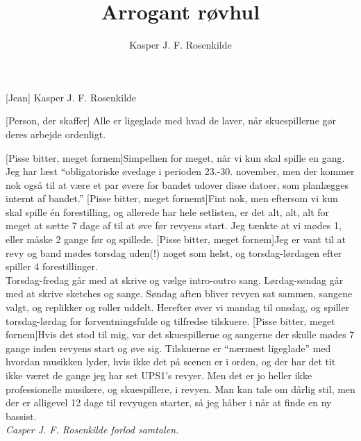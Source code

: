 \documentclass[a4paper,11pt]{article}
\title{Arrogant røvhul}
\author{Kasper J. F. Rosenkilde}
\begin{document}
\maketitle

\begin{roles}
    [Jean] Kasper J. F. Rosenkilde
\end{roles}

\begin{props}
    [Person, der skaffer] Alle er ligeglade med hvad de laver, når skuespillerne gør deres arbejde ordenligt.
\end{props}


\begin{sketch}


[Pisse bitter, meget fornem]Simpelhen for meget, når vi kun skal spille en gang. Jeg har læst ``obligatoriske øvedage i perioden 23.-30. november, men der kommer nok også til at være et par øvere for bandet udover disse datoer, som planlægges internt af bandet.''
[Pisse bitter, meget fornemt]Fint nok, men eftersom vi kun skal spille én forestilling, og allerede har hele setlisten, er det alt, alt, alt for meget at sætte 7 dage af til at øve før revyens start. Jeg tænkte at vi mødes 1, eller måske 2 gange før og spillede. 
[Pisse bitter, meget fornem]Jeg er vant til at revy og band mødes torsdag uden(!) noget som helst, og torsdag-lørdagen efter spiller 4 forestillinger.\\
Torsdag-fredag går med at skrive og vælge intro-outro sang. Lørdag-søndag går med at skrive sketches og sange. Søndag aften bliver revyen sat sammen, sangene valgt, og replikker og roller uddelt. Herefter øver vi mandag til onsdag, og spiller torsdag-lørdag for forventningsfulde og tilfredse tilskuere.
[Pisse bitter, meget fornem]Hvis det stod til mig, var det skuespillerne og sangerne der skulle mødes 7 gange inden revyens start og øve sig. Tilskuerne er ``nærmest ligeglade'' med hvordan musikken lyder, hvis ikke det på scenen er i orden, og der har det tit ikke været de gange jeg har set UPS1's revyer. Men det er jo heller ikke professionelle musikere, og skuespillere, i revyen. Man kan tale om dårlig stil, men der er alligevel 12 dage til revyugen starter, så jeg håber i når at finde en ny bassist.\\
\emph{Casper J. F. Rosenkilde forlod samtalen.}



\end{sketch}
\end{document}
